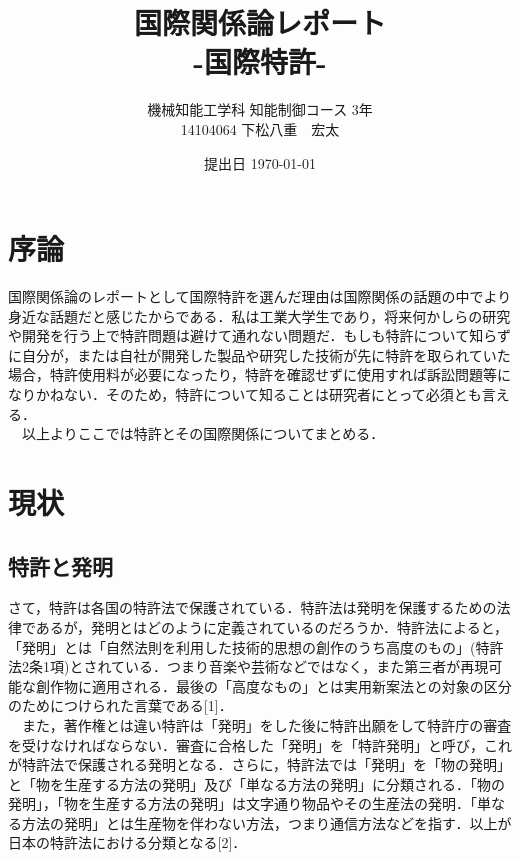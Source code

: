 \documentclass[11pt,a4paper]{jsarticle}
\begin{document}
\title{国際関係論レポート \\ -国際特許-}
\author{機械知能工学科 知能制御コース 3年 \\ 14104064 下松八重　宏太}
\date{提出日 \today}



\maketitle
\thispagestyle{empty}
\newpage


 \section{序論}
 国際関係論のレポートとして国際特許を選んだ理由は国際関係の話題の中でより身近な話題だと感じたからである．私は工業大学生であり，将来何かしらの研究や開発を行う上で特許問題は避けて通れない問題だ．もしも特許について知らずに自分が，または自社が開発した製品や研究した技術が先に特許を取られていた場合，特許使用料が必要になったり，特許を確認せずに使用すれば訴訟問題等になりかねない．そのため，特許について知ることは研究者にとって必須とも言える．\\
 　以上よりここでは特許とその国際関係についてまとめる．
 
\section{現状}
  \subsection{特許と発明}
  さて，特許は各国の特許法で保護されている．特許法は発明を保護するための法律であるが，発明とはどのように定義されているのだろうか．特許法によると，「発明」とは「自然法則を利用した技術的思想の創作のうち高度のもの」(特許法2条1項)とされている．つまり音楽や芸術などではなく，また第三者が再現可能な創作物に適用される．最後の「高度なもの」とは実用新案法との対象の区分のためにつけられた言葉である[1]．\\
  　また，著作権とは違い特許は「発明」をした後に特許出願をして特許庁の審査を受けなければならない．審査に合格した「発明」を「特許発明」と呼び，これが特許法で保護される発明となる．さらに，特許法では「発明」を「物の発明」と「物を生産する方法の発明」及び「単なる方法の発明」に分類される．「物の発明」，「物を生産する方法の発明」は文字通り物品やその生産法の発明．「単なる方法の発明」とは生産物を伴わない方法，つまり通信方法などを指す．以上が日本の特許法における分類となる[2]．
  
\end{document}
